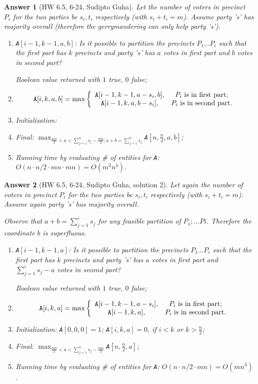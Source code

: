 \documentclass[11pt]{article}
\theoremstyle{numberplain}
\theoremstyle{nonumberplain}
\newtheorem{ans}{Answer}
\newcommand{\dps}{\displaystyle}
\newcommand{\0}{{\mathbf{0}}}
\begin{document}
\begin{ans}[HW 6.5, 6-24, Sudipto Guha]
Let the number of voters in precinct $P_i$ for the two parties be $s_i, t_i$ respectively (with
$s_i + t_i = m$). Assume party 's' has majority overall (therefore the gerrymandering can only help
party 's').

\begin{enumerate}
\item {\tt A}$[i-1,k-1,a,b]$: Is it possible to partition the precincts $P_1\ldots P_i$ such that the first part has $k$ precincts and party 's' has $a$ votes in first part and $b$ votes in second part?

Boolean value returned with $1$ true, $0$ false;
\item $${\tt A}[i,k,a,b]=\max\left\{\begin{array}{cc}
{\tt A}[i-1,k-1,a-s_i,b], & P_i\text{ is in first part};\\
{\tt A}[i-1,k,a,b-s_i], & P_i\text{ is in second part}.
\end{array}\right.$$
\item Initialization: %
\item Final: $\dps \max_{\dps \frac{mn}{2}< a<\sum_{j=1}^n s_j-\frac{mn}{2}; a+b=\sum_{j=1}^n s_j} ${\tt A}$[n,\frac n 2,a, b]$;
\item Running time by evaluating \# of entities for {\tt A}: $O(n\cdot n/2\cdot mn \cdot mn)=O(m^2n^4)$.
\end{enumerate}
\end{ans}
\begin{ans}[HW 6.5, 6-24, Sudipto Guha, solution 2]
Let again the number of voters in precinct $P_i$ for the two parties be $s_i, t_i$ respectively (with
$s_i + t_i = m$). Assume again party 's' has majority overall.

Observe that $a + b =\sum^{i}_{j=1} s_j$ for any feasible partition of $P_1; \ldots Pi$. Therefore
the coordinate $b$ is superfluous.

\begin{enumerate}
\item {\tt A}$[i-1,k-1,a]$: Is it possible to partition the precincts $P_1\ldots P_i$ such that the first part has $k$ precincts and party 's' has $a$ votes in first part and $\sum_{j=1}^i s_j-a$ votes in second part?

Boolean value returned with $1$ true, $0$ false;
\item $${\tt A}[i,k,a]=\max\left\{\begin{array}{cc}
{\tt A}[i-1,k-1,a-s_i], & P_i\text{ is in first part};\\
{\tt A}[i-1,k,a], & P_i\text{ is in second part}.
\end{array}\right.$$
\item Initialization: {\tt A}$[0,0,0]=1$; {\tt A}$[i,k,a]=0$, if $i<k$ or $k>\frac n 2$;
\item Final: $\dps \max_{\dps \frac{mn}{2}< a<\sum_{j=1}^n s_j-\frac{mn}{2}} ${\tt A}$[n,\frac n 2,a]$;
\item Running time by evaluating \# of entities for {\tt A}: $O(n\cdot n/2\cdot mn )=O(mn^3)$.
\end{enumerate}

\end{ans}
\end{document}
